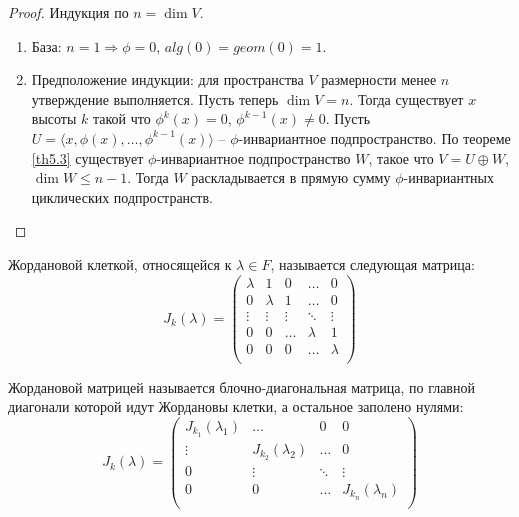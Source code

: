 \begin{proof}
    Индукция по $n = \dim V$. 
    \begin{enumerate}
        \item База: $n = 1 \Rightarrow \phi = 0$, $alg(0) = geom(0) = 1$.
        \item Предположение индукции: для пространства $V$ размерности менее $n$ утверждение выполняется. 
        Пусть теперь $\dim V = n$. 
        Тогда существует $x$ высоты $k$ такой что $\phi^k(x) = 0$, $\phi^{k-1}(x) \neq 0$. 
        Пусть $U = \langle x, \phi(x), \dots, \phi^{k-1}(x) \rangle$ -- $\phi$-инвариантное подпространство.
        По теореме \ref{th5.3} существует $\phi$-инвариантное подпространство $W$, такое что  
        $V = U \oplus W$, $\dim W \leq n-1$. Тогда $W$ раскладывается в прямую сумму 
        $\phi$-инвариантных циклических подпространств.
    \end{enumerate}
\end{proof}

\begin{definition}
    Жордановой клеткой, относящейся к  $\lambda \in F$, называется следующая матрица:
    \[J_{k}(\lambda) = \begin{pmatrix}
    \lambda      & 1      & 0      & \dots  & 0\\
        0      & \lambda      & 1      & \dots  & 0\\
        \vdots & \vdots & \vdots & \ddots & \vdots \\
        0      & 0      & \dots      & \lambda  & 1\\
        0      & 0      & 0      & \dots  & \lambda \\
    \end{pmatrix}\]
\end{definition}

\begin{definition}
    Жордановой матрицей называется блочно-диагональная матрица, по главной диагонали которой идут 
    Жордановы клетки, а остальное заполено нулями:
    \[J_{k}(\lambda) = \begin{pmatrix}
        J_{k_1}(\lambda_1)      & \dots      & 0    & 0 \\
        \vdots      & J_{k_2}(\lambda_2)      & \dots   & 0 \\
        0   & \vdots     & \ddots    & \vdots \\
        0      & 0      & \dots    & J_{k_n}(\lambda_n) \\
        \end{pmatrix}\]
\end{definition}

